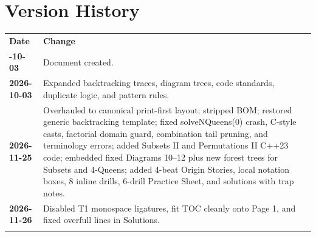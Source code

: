 \documentclass[11pt,a4paper]{article}
\theoremstyle{definition}
\begin{document}
\section*{Version History}

\begin{center}
\begingroup
\small
{}
\begin{tabularx}{\textwidth}{>{\bfseries}l >{\raggedright\arraybackslash}X}
\arrayrulecolor{primaryblue}\toprule[1.2pt]
\rowcolor{primaryblue!10}
\textcolor{primaryblue}{\textbf{Date}} & \textcolor{primaryblue}{\textbf{Change}} \\
\arrayrulecolor{codeframe}\midrule[0.6pt]
2026-10-03 & Document created. \\
2026-10-03 & Expanded backtracking traces, diagram trees, code standards, duplicate logic, and pattern rules. \\
2026-11-25 & Overhauled to canonical print-first layout; stripped BOM; restored generic backtracking template; fixed solveNQueens(0) crash, C-style casts, factorial domain guard, combination tail pruning, and terminology errors; added Subsets II and Permutations II C++23 code; embedded fixed Diagrams 10--12 plus new forest trees for Subsets and 4-Queens; added 4-beat Origin Stories, local notation boxes, 8 inline drills, 6-drill Practice Sheet, and solutions with trap notes. \\
2026-11-26 & Disabled T1 monospace ligatures, fit TOC cleanly onto Page 1, and fixed overfull lines in Solutions. \\
\arrayrulecolor{primaryblue}\bottomrule[1.2pt]
\end{tabularx}
\endgroup
\end{center}
\end{document}
